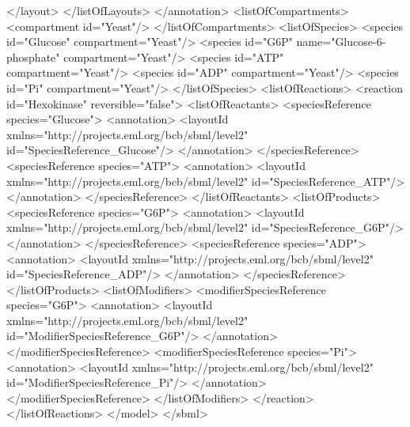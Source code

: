 \begin{example}
       </layout>
     </listOfLayouts>
    </annotation>
    <listOfCompartments>
      <compartment id="Yeast"/>
    </listOfCompartments>
    <listOfSpecies>
      <species id="Glucose" compartment="Yeast"/>
      <species id="G6P" name="Glucose-6-phosphate" compartment="Yeast"/>
      <species id="ATP" compartment="Yeast"/>
      <species id="ADP" compartment="Yeast"/>
      <species id="Pi" compartment="Yeast"/>
    </listOfSpecies>
    <listOfReactions>
      <reaction id="Hexokinase" reversible="false">
        <listOfReactants>
          <speciesReference species="Glucose">
            <annotation>
              <layoutId xmlns="http://projects.eml.org/bcb/sbml/level2"
                        id="SpeciesReference_Glucose"/>
            </annotation>
          </speciesReference>
          <speciesReference species="ATP">
            <annotation>
              <layoutId xmlns="http://projects.eml.org/bcb/sbml/level2" 
                        id="SpeciesReference_ATP"/>
            </annotation>
          </speciesReference>
        </listOfReactants>
        <listOfProducts>
          <speciesReference species="G6P">
            <annotation>
              <layoutId xmlns="http://projects.eml.org/bcb/sbml/level2" 
                        id="SpeciesReference_G6P"/>
            </annotation>
          </speciesReference>
          <speciesReference species="ADP">
            <annotation>
              <layoutId xmlns="http://projects.eml.org/bcb/sbml/level2"
                        id="SpeciesReference_ADP"/>
            </annotation>
          </speciesReference>
        </listOfProducts>
        <listOfModifiers>
          <modifierSpeciesReference species="G6P">
            <annotation>
              <layoutId xmlns="http://projects.eml.org/bcb/sbml/level2"
                        id="ModifierSpeciesReference_G6P"/>
            </annotation>
          </modifierSpeciesReference>
          <modifierSpeciesReference species="Pi">
            <annotation>
              <layoutId xmlns="http://projects.eml.org/bcb/sbml/level2" 
                        id="ModifierSpeciesReference_Pi"/>
            </annotation>
          </modifierSpeciesReference>
        </listOfModifiers>
      </reaction>
    </listOfReactions>
  </model>
</sbml>
\end{example}
